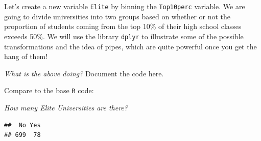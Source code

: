 \documentclass[]{article}
\newenvironment{Shaded}{\begin{snugshade}}{\end{snugshade}}
\newcommand{\KeywordTok}[1]{\textcolor[rgb]{0.13,0.29,0.53}{\textbf{#1}}}
\newcommand{\DataTypeTok}[1]{\textcolor[rgb]{0.13,0.29,0.53}{#1}}
\newcommand{\DecValTok}[1]{\textcolor[rgb]{0.00,0.00,0.81}{#1}}
\newcommand{\StringTok}[1]{\textcolor[rgb]{0.31,0.60,0.02}{#1}}
\newcommand{\OperatorTok}[1]{\textcolor[rgb]{0.81,0.36,0.00}{\textbf{#1}}}
\newcommand{\NormalTok}[1]{#1}
\begin{document}
Let's create a new variable \texttt{Elite} by binning the
\texttt{Top10perc} variable. We are going to divide universities into
two groups based on whether or not the proportion of students coming
from the top 10\% of their high school classes exceeds 50\%. We will use
the library \texttt{dplyr} to illustrate some of the possible
transformations and the idea of pipes, which are quite powerful once you
get the hang of them!

\begin{Shaded}
\end{Shaded}

\emph{What is the above doing?} Document the code here.

Compare to the base \texttt{R} code:

\begin{Shaded}
\end{Shaded}

\emph{How many Elite Universities are there?}

\begin{Shaded}
\end{Shaded}

\begin{verbatim}
##  No Yes 
## 699  78
\end{verbatim}
\end{document}
